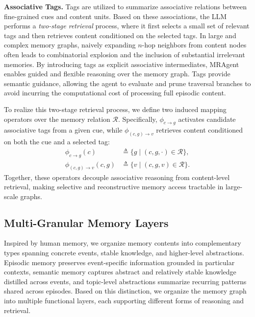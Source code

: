 \textbf{Associative Tags.} 
Tags are utilized to summarize associative relations between fine-grained cues and content units.
Based on these associations, the LLM performs a \emph{two-stage retrieval} process, where it first selects a small set of relevant tags and then retrieves content conditioned on the selected tags.
In large and complex memory graphs, naively expanding $n$-hop neighbors from content nodes often leads to combinatorial explosion and the inclusion of substantial irrelevant memories.
By introducing tags as explicit associative intermediates, MRAgent enables guided and flexible reasoning over the memory graph.
Tags provide semantic guidance, allowing the agent to evaluate and prune traversal branches to avoid incurring the computational cost of processing full episodic content.

To realize this two-stage retrieval process, we define two induced mapping operators over the memory relation $\mathcal{R}$.
Specifically, $\phi_{c \rightarrow g}$ activates candidate associative tags from a given cue, while $\phi_{(c,g) \rightarrow v}$ retrieves content conditioned on both the cue and a selected tag:
\begin{equation}
\begin{aligned}
\phi_{c \rightarrow g}(c)
&\triangleq \{ g \mid (c,g,\cdot) \in \mathcal{R} \}, \\
\phi_{(c,g) \rightarrow v}(c,g)
&\triangleq \{ v \mid (c,g,v) \in \mathcal{R} \}.
\label{eq:phi}
\end{aligned}
\end{equation}
Together, these operators decouple associative reasoning from content-level retrieval, making selective and reconstructive memory access tractable in large-scale graphs.

\subsection{Multi-Granular Memory Layers}
\label{subsec:layers}

Inspired by human memory, we organize memory contents into complementary types spanning concrete events, stable knowledge, and higher-level abstractions. Episodic memory preserves event-specific information grounded in particular contexts, semantic memory captures abstract and relatively stable knowledge distilled across events, and topic-level abstractions summarize recurring patterns shared across episodes. Based on this distinction, we organize the memory graph into multiple functional layers, each supporting different forms of reasoning and retrieval.

